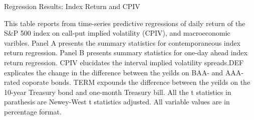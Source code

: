 \begin{table}[h]

\caption{Regression Results: Index Return and CPIV}\label{table:regression2}
\begin{threeparttable}

\medskip

{\scriptsize 
This table reports from time-series predictive regressions of daily return of the S\&P 500 index on call-put implied volatility (CPIV), and macroeconomic varibles. Panel A presents the summary statistics for contemporaneous index return regression. Panel B presents summary statistics for one-day ahead index return regression. CPIV elucidates the interval implied volatility spreads.DEF explicates the change in the difference between the yeilds on BAA- and AAA-rated coporate bonds. TERM expounds the difference between the yeilds on the 10-year Treasury bond and one-month Treasury bill. All the t statistics in parathesis are Newey-West t statistics adjusted. All variable values are in percentage format.  
}
\medskip

\begin{subtable}[t]{\linewidth}


\end{subtable}
\end{threeparttable}
\end{table}
